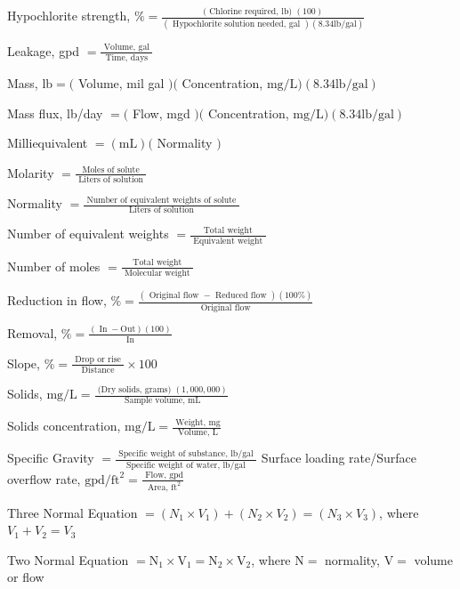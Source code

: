 \documentclass[10pt]{article}
\begin{document}
Hypochlorite strength, $\%=\frac{(\text { Chlorine required, lb) }(100)}{(\text { Hypochlorite solution needed, gal })(8.34 \mathrm{lb} / \mathrm{gal})}$

Leakage, gpd $=\frac{\text { Volume, gal }}{\text { Time, days }}$

Mass, $\mathrm{lb}=($ Volume, mil gal $)($ Concentration, $\mathrm{mg} / \mathrm{L})(8.34 \mathrm{lb} / \mathrm{gal})$

Mass flux, lb/day $=($ Flow, mgd $)($ Concentration, $\mathrm{mg} / \mathrm{L})(8.34 \mathrm{lb} / \mathrm{gal})$

Milliequivalent $=(\mathrm{mL})($ Normality $)$

Molarity $=\frac{\text { Moles of solute }}{\text { Liters of solution }}$

Normality $=\frac{\text { Number of equivalent weights of solute }}{\text { Liters of solution }}$

Number of equivalent weights $=\frac{\text { Total weight }}{\text { Equivalent weight }}$

Number of moles $=\frac{\text { Total weight }}{\text { Molecular weight }}$

Reduction in flow, $\%=\frac{(\text { Original flow }-\text { Reduced flow })(100 \%)}{\text { Original flow }}$

Removal, $\%=\frac{(\operatorname{In}-\mathrm{Out})(100)}{\operatorname{In}}$

Slope, $\%=\frac{\text { Drop or rise }}{\text { Distance }} \times 100$

Solids, $\mathrm{mg} / \mathrm{L}=\frac{\text { (Dry solids, grams) }(1,000,000)}{\text { Sample volume, } \mathrm{mL}}$

Solids concentration, $\mathrm{mg} / \mathrm{L}=\frac{\text { Weight, } \mathrm{mg}}{\text { Volume, } \mathrm{L}}$

Specific Gravity $=\frac{\text { Specific weight of substance, lb/gal }}{\text { Specific weight of water, lb/gal }}$ Surface loading rate/Surface overflow rate, $\mathrm{gpd} / \mathrm{ft}^{2}=\frac{\text { Flow, } \mathrm{gpd}}{\text { Area, } \mathrm{ft}^{2}}$

Three Normal Equation $=\left(N_{1} \times V_{1}\right)+\left(N_{2} \times V_{2}\right)=\left(N_{3} \times V_{3}\right)$, where $V_{1}+V_{2}=V_{3}$

Two Normal Equation $=\mathrm{N}_{1} \times \mathrm{V}_{1}=\mathrm{N}_{2} \times \mathrm{V}_{2}$, where $\mathrm{N}=$ normality, $\mathrm{V}=$ volume or flow
\end{document}
